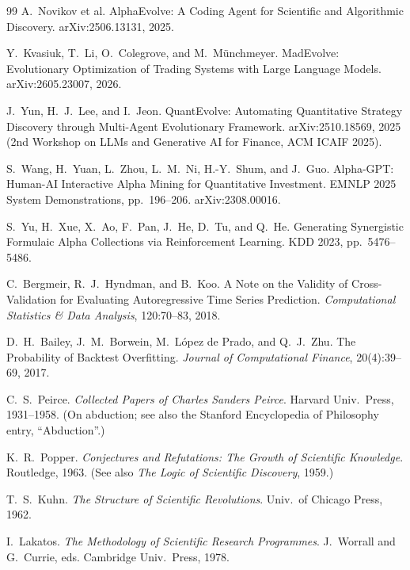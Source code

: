 \documentclass[11pt]{article}
\begin{document}
\begin{thebibliography}{99}
 A.~Novikov et al.
\newblock AlphaEvolve: A Coding Agent for Scientific and Algorithmic Discovery.
\newblock arXiv:2506.13131, 2025.

 Y.~Kvasiuk, T.~Li, O.~Colegrove, and M.~M\"unchmeyer.
\newblock MadEvolve: Evolutionary Optimization of Trading Systems with Large Language Models.
\newblock arXiv:2605.23007, 2026.

 J.~Yun, H.~J.~Lee, and I.~Jeon.
\newblock QuantEvolve: Automating Quantitative Strategy Discovery through Multi-Agent Evolutionary
Framework.
\newblock arXiv:2510.18569, 2025 (2nd Workshop on LLMs and Generative AI for Finance, ACM ICAIF 2025).

 S.~Wang, H.~Yuan, L.~Zhou, L.~M.~Ni, H.-Y.~Shum, and J.~Guo.
\newblock Alpha-GPT: Human-AI Interactive Alpha Mining for Quantitative Investment.
\newblock EMNLP 2025 System Demonstrations, pp.~196--206. arXiv:2308.00016.

 S.~Yu, H.~Xue, X.~Ao, F.~Pan, J.~He, D.~Tu, and Q.~He.
\newblock Generating Synergistic Formulaic Alpha Collections via Reinforcement Learning.
\newblock KDD 2023, pp.~5476--5486.

 C.~Bergmeir, R.~J.~Hyndman, and B.~Koo.
\newblock A Note on the Validity of Cross-Validation for Evaluating Autoregressive Time Series
Prediction.
\newblock \emph{Computational Statistics \& Data Analysis}, 120:70--83, 2018.

 D.~H.~Bailey, J.~M.~Borwein, M.~L\'opez de Prado, and Q.~J.~Zhu.
\newblock The Probability of Backtest Overfitting.
\newblock \emph{Journal of Computational Finance}, 20(4):39--69, 2017.

 C.~S.~Peirce.
\newblock \emph{Collected Papers of Charles Sanders Peirce}. Harvard Univ.\ Press, 1931--1958.
\newblock (On abduction; see also the Stanford Encyclopedia of Philosophy entry, ``Abduction''.)

 K.~R.~Popper.
\newblock \emph{Conjectures and Refutations: The Growth of Scientific Knowledge}. Routledge, 1963.
\newblock (See also \emph{The Logic of Scientific Discovery}, 1959.)

 T.~S.~Kuhn.
\newblock \emph{The Structure of Scientific Revolutions}. Univ.\ of Chicago Press, 1962.

 I.~Lakatos.
\newblock \emph{The Methodology of Scientific Research Programmes}. J.~Worrall and G.~Currie, eds.
Cambridge Univ.\ Press, 1978.


\end{thebibliography}
\end{document}
